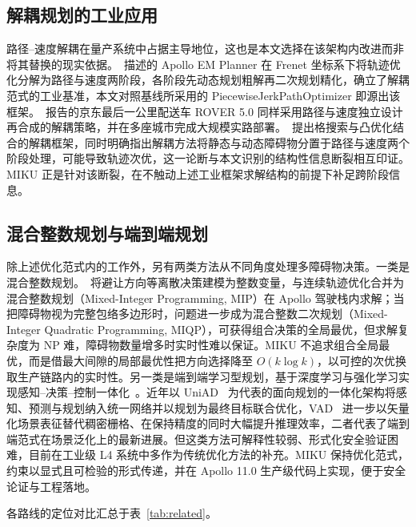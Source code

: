 \documentclass[a4paper,11pt]{ctexart}
\theoremstyle{definition}
\begin{document}
\subsection{解耦规划的工业应用}
\label{sec:related-industrial}

路径--速度解耦在量产系统中占据主导地位，这也是本文选择在该架构内改进而非将其替换的现实依据。\citet{fan2018baidu}~描述的 Apollo EM Planner 在 Frenet 坐标系下将轨迹优化分解为路径与速度两阶段，各阶段先动态规划粗解再二次规划精化，确立了解耦范式的工业基准，本文对照基线所采用的 PiecewiseJerkPathOptimizer 即源出该框架。\citet{wang2022_jfr}~报告的京东最后一公里配送车 ROVER 5.0 同样采用路径与速度独立设计再合成的解耦策略，并在多座城市完成大规模实路部署。\citet{meng2019_access}~提出格搜索与凸优化结合的解耦框架，同时明确指出解耦方法将静态与动态障碍物分置于路径与速度两个阶段处理，可能导致轨迹次优，这一论断与本文识别的结构性信息断裂相互印证。MIKU 正是针对该断裂，在不触动上述工业框架求解结构的前提下补足跨阶段信息。

\subsection{混合整数规划与端到端规划}
\label{sec:related-supplement}

除上述优化范式内的工作外，另有两类方法从不同角度处理多障碍物决策。一类是混合整数规划。\citet{kessler2023}~将避让方向等离散决策建模为整数变量，与连续轨迹优化合并为混合整数规划（Mixed-Integer Programming, MIP）在 Apollo 驾驶栈内求解；当把障碍物视为完整包络多边形时，问题进一步成为混合整数二次规划（Mixed-Integer Quadratic Programming, MIQP），可获得组合决策的全局最优，但求解复杂度为 NP 难，障碍物数量增多时实时性难以保证。MIKU 不追求组合全局最优，而是借最大间隙的局部最优性把方向选择降至 $O(k\log k)$，以可控的次优换取生产链路内的实时性。另一类是端到端学习型规划，基于深度学习与强化学习实现感知--决策--控制一体化~\citep{li2024decision,zhang2021autonomous}。近年以 UniAD~\citep{hu2023uniad} 为代表的面向规划的一体化架构将感知、预测与规划纳入统一网络并以规划为最终目标联合优化，VAD~\citep{jiang2023vad} 进一步以矢量化场景表征替代稠密栅格、在保持精度的同时大幅提升推理效率，二者代表了端到端范式在场景泛化上的最新进展。但这类方法可解释性较弱、形式化安全验证困难，目前在工业级 L4 系统中多作为传统优化方法的补充。MIKU 保持优化范式，约束以显式且可检验的形式传递，并在 Apollo 11.0 生产级代码上实现，便于安全论证与工程落地。

各路线的定位对比汇总于表~\ref{tab:related}。
\end{document}
